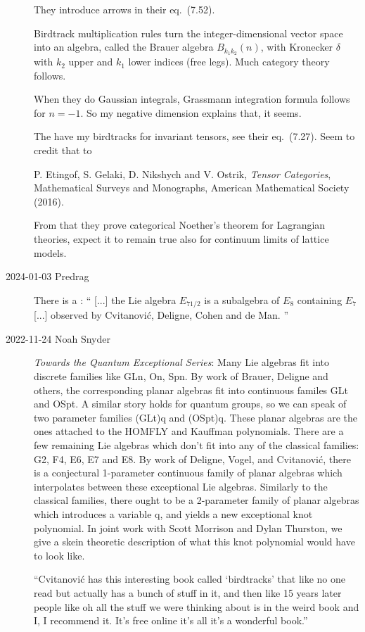 \begin{description}
They introduce arrows in their eq.~(7.52).

Birdtrack multiplication rules turn the integer-dimensional vector space into an algebra,
called the Brauer algebra $B_{k_1k_2}(n)$, with Kronecker $\delta$ with
 $k_2$ upper and  $k_1$  lower indices (free legs).  Much category theory follows.

When they do Gaussian integrals, Grassmann integration formula follows for
$n=-1$. So my negative dimension explains that, it seems.

The have my birdtracks for invariant tensors, see their eq.~(7.27).
Seem to credit that to

P. Etingof, S. Gelaki, D. Nikshych and V. Ostrik,
{\em Tensor Categories}, Mathematical Surveys
and Monographs, American Mathematical Society (2016).

From that they prove categorical Noether's theorem for Lagrangian theories,
expect it to
remain true also for continuum limits of lattice models.

\item[2024-01-03 Predrag]
There is a
:
``
[...] the Lie algebra $E_{7 1/2}$ is a subalgebra of $E_{8}$ containing
$E_{7}$ [...] observed by Cvitanovi{\'c}, Deligne, Cohen and de Man.
''

\item[2022-11-24 Noah Snyder]
{\em Towards the Quantum Exceptional Series}:
Many Lie algebras fit into discrete families like GLn, On, Spn. By work
of Brauer, Deligne and others, the corresponding planar algebras fit into
continuous familes GLt and OSpt. A similar story holds for quantum groups,
so we can speak of two parameter families (GLt)q and (OSpt)q. These
planar algebras are the ones attached to the HOMFLY and Kauffman
polynomials. There are a few remaining Lie algebras which don't fit into
any of the classical families: G2, F4, E6, E7 and E8. By work of Deligne,
Vogel, and Cvitanovi{\'c}, there is a conjectural 1-parameter  continuous
family of planar algebras which interpolates between these exceptional
Lie algebras. Similarly to the classical families, there ought to be a
2-parameter family of planar algebras which introduces a variable q, and
yields a new exceptional knot polynomial. In joint work with Scott
Morrison and Dylan Thurston, we give a skein theoretic description of
what this knot polynomial would have to look like.

``Cvitanovi{\'c} has this interesting book called `birdtracks'
that like no one read but actually has a bunch of stuff in it, and
then like 15 years later people like oh all the stuff we were thinking about
is in the weird book and  I, I recommend it. It's free online it's all
it's a wonderful book.''


\end{description}
